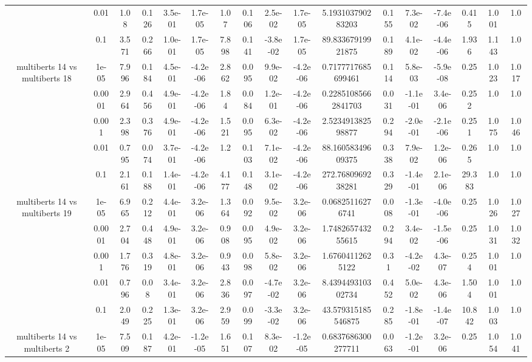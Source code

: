 \begin{tabular}{|c|c|c|c|c|c|c|c|c|c|c|c|c|c|c|c|c|}
 & 0.01 & 1.08 & 0.126 & 3.5e-01 & 1.7e-05 & 1.07 & 0.106 & 2.5e-02 & 1.7e-05 & 5.193103790283203 & 0.155 & 7.3e-02 & -7.4e-06 & 0.415 & 1.001 & 1.0 \\
 & 0.1 & 3.571 & 0.266 & 1.0e-01 & 1.7e-05 & 7.898 & 0.141 & -3.8e-02 & 1.7e-05 & 89.83367919921875 & 0.189 & 4.1e-02 & -4.4e-06 & 1.936 & 1.143 & 1.0 \\
\hline
\multirow{5}{*}{multiberts 14 vs multiberts 18} & 1e-05 & 7.996 & 0.184 & 4.5e-01 & -4.2e-06 & 2.862 & 0.095 & 9.9e-02 & -4.2e-06 & 0.7177717685699461 & 0.114 & 5.8e-03 & -5.9e-08 & 0.25 & 1.023 & 1.017 \\
 & 0.0001 & 2.964 & 0.456 & 4.9e-01 & -4.2e-06 & 1.84 & 0.084 & 1.2e-01 & -4.2e-06 & 0.22851085662841703 & 0.031 & -1.1e-01 & 3.4e-06 & 0.252 & 1.0 & 1.0 \\
 & 0.001 & 2.398 & 0.376 & 4.9e-01 & -4.2e-06 & 1.521 & 0.095 & 6.3e-02 & -4.2e-06 & 2.523491382598877 & 0.294 & -2.0e-01 & -2.1e-06 & 0.251 & 1.075 & 1.046 \\
 & 0.01 & 0.795 & 0.074 & 3.7e-01 & -4.2e-06 & 1.2 & 0.103 & 7.1e-02 & -4.2e-06 & 88.16058349609375 & 0.338 & 7.9e-02 & 1.2e-06 & 0.265 & 1.0 & 1.0 \\
 & 0.1 & 2.161 & 0.188 & 1.4e-01 & -4.2e-06 & 4.177 & 0.148 & 3.1e-02 & -4.2e-06 & 272.7680969238281 & 0.329 & -1.4e-01 & 2.1e-06 & 29.383 & 1.0 & 1.0 \\
\hline
\multirow{5}{*}{multiberts 14 vs multiberts 19} & 1e-05 & 6.965 & 0.212 & 4.4e-01 & 3.2e-06 & 1.364 & 0.092 & 9.5e-02 & 3.2e-06 & 0.06825116276741 & 0.008 & -1.3e-01 & -4.0e-06 & 0.25 & 1.026 & 1.027 \\
 & 0.0001 & 2.704 & 0.448 & 4.9e-01 & 3.2e-06 & 0.908 & 0.095 & 4.9e-02 & 3.2e-06 & 1.748265743255615 & 0.294 & 3.4e-02 & -1.5e-06 & 0.25 & 1.031 & 1.032 \\
 & 0.001 & 1.776 & 0.319 & 4.8e-01 & 3.2e-06 & 0.943 & 0.098 & 5.8e-02 & 3.2e-06 & 1.67604112625122 & 0.31 & -4.2e-02 & 4.3e-07 & 0.254 & 1.001 & 1.0 \\
 & 0.01 & 0.796 & 0.08 & 3.4e-01 & 3.2e-06 & 2.836 & 0.097 & -4.7e-02 & 3.2e-06 & 8.439449310302734 & 0.452 & 5.0e-02 & 4.3e-06 & 1.504 & 1.001 & 1.0 \\
 & 0.1 & 2.049 & 0.225 & 1.3e-01 & 3.2e-06 & 2.959 & 0.099 & -3.3e-02 & 3.2e-06 & 43.579315185546875 & 0.285 & -1.8e-01 & -1.4e-07 & 10.842 & 1.003 & 1.0 \\
\hline
\multirow{5}{*}{multiberts 14 vs multiberts 2} & 1e-05 & 7.509 & 0.187 & 4.2e-01 & -1.2e-05 & 1.651 & 0.107 & 8.3e-02 & -1.2e-05 & 0.6837686300277711 & 0.063 & -1.2e-01 & 3.2e-06 & 0.25 & 1.054 & 1.041 \\

\end{tabular}
